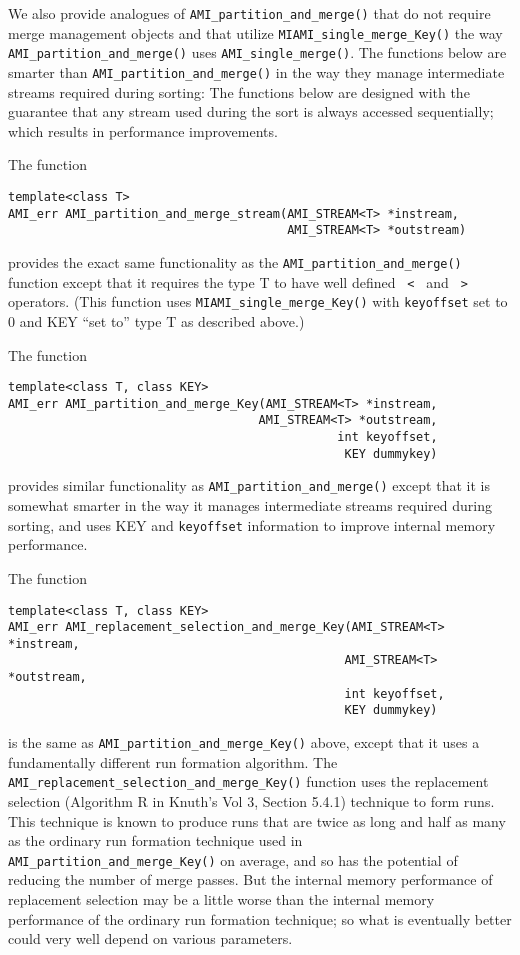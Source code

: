 We also provide analogues of \verb|AMI_partition_and_merge()|
that do not require merge management objects and 
that utilize  \verb|MIAMI_single_merge_Key()| the way 
\verb|AMI_partition_and_merge()| uses \verb|AMI_single_merge()|.
The functions below are  smarter than
\verb|AMI_partition_and_merge()|  in the way  they manage
intermediate streams required during sorting: The functions below are
designed with the guarantee that any stream used during the sort is 
always accessed sequentially; which results in performance improvements.


The function
\begin{verbatim}
template<class T>
AMI_err AMI_partition_and_merge_stream(AMI_STREAM<T> *instream,
                                       AMI_STREAM<T> *outstream)
\end{verbatim}
provides the exact same functionality as the
\verb|AMI_partition_and_merge()| function except that it requires 
the type T to have well defined  \verb| < | and \verb| > | operators.
(This function uses \verb|MIAMI_single_merge_Key()| with 
 {\tt keyoffset} set to 0 and KEY ``set to'' type T as described
above.)

The function 
\begin{verbatim}
template<class T, class KEY>
AMI_err AMI_partition_and_merge_Key(AMI_STREAM<T> *instream,
                                   AMI_STREAM<T> *outstream, 
                                              int keyoffset, 
                                               KEY dummykey)
\end{verbatim}
provides similar functionality as \verb|AMI_partition_and_merge()|
except that it is somewhat smarter in the way it manages intermediate
streams required during sorting, and uses KEY and {\tt keyoffset}
information to improve internal memory performance. 

The function
\begin{verbatim}
template<class T, class KEY>
AMI_err AMI_replacement_selection_and_merge_Key(AMI_STREAM<T> *instream,
                                               AMI_STREAM<T> *outstream, 
                                               int keyoffset,
                                               KEY dummykey)
\end{verbatim}
is the same as \verb|AMI_partition_and_merge_Key()| above, except that
it uses a fundamentally different run formation algorithm. The 
\verb|AMI_replacement_selection_and_merge_Key()| function uses
the replacement selection (Algorithm R in Knuth's Vol 3, Section 5.4.1)
technique to form runs. This technique is known to produce runs that
are twice as long and half as many as the ordinary run formation
technique used in  \verb|AMI_partition_and_merge_Key()| on average,
and so has the potential of reducing the number of merge passes.
But the internal memory performance of replacement selection may
be a little worse than the internal memory performance of the ordinary
run formation technique; so what is eventually better could very well
depend on various parameters.



